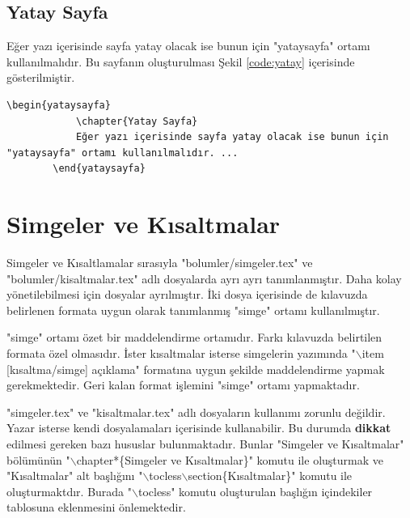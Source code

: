 \begin{yataysayfa}
	\chapter{Yatay Sayfa}
	Eğer yazı içerisinde sayfa yatay olacak ise bunun için "yataysayfa" ortamı kullanılmalıdır. Bu sayfanın oluşturulması Şekil \ref{code:yatay} içerisinde gösterilmiştir.
	
	\begin{lstlisting}[language={[LaTeX]{TeX}}, label=code:yatay, caption=Yatay sayfa oluşturulması]
		\begin{yataysayfa}
			\chapter{Yatay Sayfa}
			Eğer yazı içerisinde sayfa yatay olacak ise bunun için "yataysayfa" ortamı kullanılmalıdır. ...
		\end{yataysayfa}
	\end{lstlisting}

\end{yataysayfa}



\chapter{Simgeler ve Kısaltmalar}
\label{ch:simge}
Simgeler ve Kısaltlamalar sırasıyla "bolumler/simgeler.tex" ve "bolumler/kisaltmalar.tex" adlı dosyalarda ayrı ayrı tanımlanmıştır. Daha kolay yönetilebilmesi için dosyalar ayrılmıştır. İki dosya içerisinde de kılavuzda belirlenen formata uygun olarak tanımlanmış "simge" ortamı kullanılmıştır. 

"simge" ortamı özet bir maddelendirme ortamıdır. Farkı kılavuzda belirtilen formata özel olmasıdır. İster kısaltmalar isterse simgelerin yazımında "$\backslash$item [kısaltma/simge] açıklama" formatına uygun şekilde maddelendirme yapmak gerekmektedir. Geri kalan format işlemini "simge" ortamı yapmaktadır. 

"simgeler.tex" ve "kisaltmalar.tex" adlı dosyaların kullanımı zorunlu değildir. Yazar isterse kendi dosyalamaları içerisinde kullanabilir. Bu durumda \textbf{dikkat} edilmesi gereken bazı hususlar bulunmaktadır. Bunlar "Simgeler ve Kısaltmalar" bölümünün "$\backslash$chapter*\{Simgeler ve Kısaltmalar\}" komutu ile oluşturmak ve "Kısaltmalar" alt başlığını "$\backslash$tocless$\backslash$section\{Kısaltmalar\}" komutu ile oluşturmaktdır. Burada "$\backslash$tocless" komutu oluşturulan başlığın içindekiler tablosuna eklenmesini önlemektedir. 

